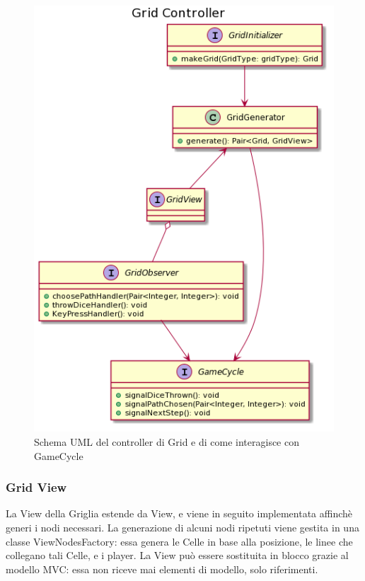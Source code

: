 \documentclass[a4paper,12pt]{report}
\begin{document}
	\begin{figure}[h]
	\centering{}
	\includegraphics[width=\textwidth]{images/miriana/grid_controller.png}
	\caption{Schema UML del controller di Grid e di come interagisce con GameCycle}
	\label{img:gridcontroller}
	\end{figure}

    \subsubsection {Grid View}
	La View della Griglia estende da View, e viene in seguito implementata affinchè generi i nodi necessari.
	La generazione di alcuni nodi ripetuti viene gestita in una classe ViewNodesFactory: essa genera le Celle in base alla posizione, le linee che collegano tali Celle, e i player.
	La View può essere sostituita in blocco grazie al modello MVC: essa non riceve mai elementi di modello, solo riferimenti.
\end{document}
